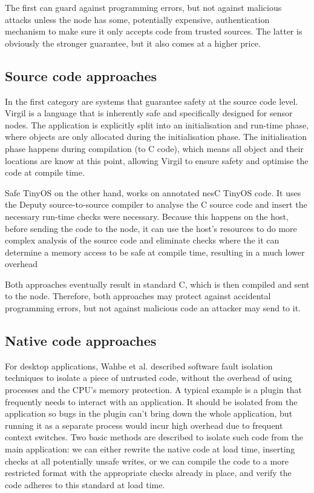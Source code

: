 The first can guard against programming errors, but not against malicious attacks unless the node has some, potentially expensive, authentication mechanism to make sure it only accepts code from trusted sources. The latter is obviously the stronger guarantee, but it also comes at a higher price.

\subsection{Source code approaches}
In the first category are systems that guarantee safety at the source code level. Virgil \cite{Titzer:2006uy} is a language that is inherently safe and specifically designed for sensor nodes. The application is explicitly split into an initialisation and run-time phase, where objects are only allocated during the initialisation phase. The initialisation phase happens during compilation (to C code), which means all object and their locations are know at this point, allowing Virgil to ensure safety and optimise the code at compile time.

Safe TinyOS on the other hand, works on annotated nesC TinyOS code. It uses the Deputy \cite{Condit:2007uo} source-to-source compiler to analyse the C source code and insert the necessary run-time checks were necessary. Because this happens on the host, before sending the code to the node, it can use the host's resources to do more complex analysis of the source code and eliminate checks where the it can determine a memory access to be safe at compile time, resulting in a much lower overhead

Both approaches eventually result in standard C, which is then compiled and sent to the node. Therefore, both approaches may protect against accidental programming errors, but not against malicious code an attacker may send to it.

\subsection{Native code approaches}
For desktop applications, Wahbe et al. described software fault isolation \cite{Wahbe:1994cj} techniques to isolate a piece of untrusted code, without the overhead of using processes and the CPU's memory protection. A typical example is a plugin that frequently needs to interact with an application. It should be isolated from the application so bugs in the plugin can't bring down the whole application, but running it as a separate process would incur high overhead due to frequent context switches. Two basic methods are described to isolate such code from the main application: we can either rewrite the native code at load time, inserting checks at all potentially unsafe writes, or we can compile the code to a more restricted format with the appropriate checks already in place, and verify the code adheres to this standard at load time.

